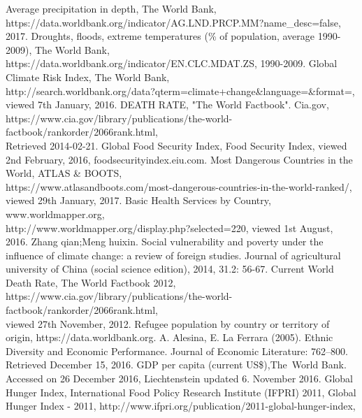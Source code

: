 \documentclass{mcmthesis}
\begin{document}
\newpage
\begin{thebibliography}{99}
 Average precipitation in depth, The World Bank, \\ 
https://data.worldbank.org/indicator/AG.LND.PRCP.MM?name\_desc=false, 
2017.
 Droughts, floods, extreme temperatures (\% of 
population, average 1990-2009), The World Bank, 
https://data.worldbank.org/indicator/EN.CLC.MDAT.ZS, 1990-2009.
 Global Climate Risk Index, The World Bank,\\
http://search.worldbank.org/data?qterm=climate+change\&language=\&format=,
\\viewed 7th January, 2016.
 DEATH RATE, "The World Factbook". Cia.gov, 
\\https://www.cia.gov/library/publications/the-world-factbook/rankorder/2066rank.html,\\ 
Retrieved 2014-02-21.
 Global Food Security Index, Food Security Index, viewed 2nd February, 2016, foodsecurityindex.eiu.com.
 Most Dangerous Countries in the World, ATLAS \& BOOTS,\\ 
https://www.atlasandboots.com/most-dangerous-countries-in-the-world-ranked/, \\
viewed 29th January, 2017.
 Basic Health Services by Country, www.worldmapper.org, \\
http://www.worldmapper.org/display.php?selected=220, viewed 1st August, 2016.
 Zhang qian;Meng huixin. Social vulnerability and 
poverty under the influence of climate change: a review of foreign studies. 
Journal of agricultural university of China (social science edition), 2014, 31.2: 56-67.
 Current World Death Rate, The World Factbook 2012,\\ 
https://www.cia.gov/library/publications/the-world-factbook/rankorder/2066rank.html, \\
viewed 27th November, 2012.
 Refugee population by country or territory of origin, https://data.worldbank.org.
 A. Alesina, E. La Ferrara (2005). Ethnic Diversity and Economic 
Performance. Journal of Economic Literature: 762–800. Retrieved December 15, 2016.
 GDP per capita (current US\$),The World Bank. Accessed on 26 December 
2016, Liechtenstein updated 6. November 2016.
 Global Hunger Index, International Food Policy Research Institute 
(IFPRI) 2011, Global Hunger Index - 2011,
http://www.ifpri.org/publication/2011-global-hunger-index, \\ 

\end{thebibliography}
\end{document}
